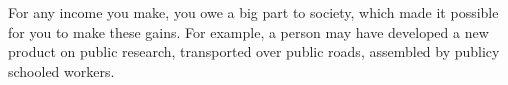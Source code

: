 For any income you make, you owe a big part to society, which made it possible for you to make these gains.
For example, a person may have developed a new product on public research, transported over public roads, assembled by publicy schooled workers.
